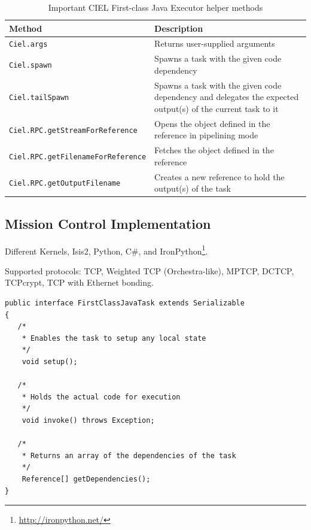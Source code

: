 \documentclass[a4paper,12pt,twoside,openright]{report}
\begin{document}
\begin{table}
  \centering
  \begin{tabularx}{6in}{|X|X|} 
    \hline
	\textbf{Method} & \textbf{Description} \\ \hline \hline
    \texttt{Ciel.args} & Returns user-supplied arguments \\ \hline
    \texttt{Ciel.spawn} & Spawns a task with the given code dependency \\ \hline
    \texttt{Ciel.tailSpawn} & Spawns a task with the given code dependency and
    delegates the expected output(s) of the current task to it
    \\ \hline
    \texttt{Ciel.RPC.getStreamForReference} & Opens the object defined
    in the reference in pipelining mode \\ \hline
    \texttt{Ciel.RPC.getFilenameForReference} & Fetches the object defined in
    the reference \\ \hline
     \texttt{Ciel.RPC.getOutputFilename} & Creates a new reference to hold the
     output(s) of the task \\ \hline
 \end{tabularx} 
  \caption{Important CIEL First-class Java Executor helper methods}
  \label{chap:implem:sec:ciel:tab:task}
\end{table}

\subsection{Mission Control Implementation}

Different Kernels, Isis2, Python, C\#, and
IronPython\footnote{\url{http://ironpython.net/}}.

Supported protocols: TCP, Weighted TCP (Orchestra-like), MPTCP, DCTCP, TCPcrypt,
TCP with Ethernet bonding.

\begin{lstlisting}[caption={\texttt{FirstClassJavaTask}
Interface},label={lst:firstclassjavatask}] 
public interface FirstClassJavaTask extends Serializable 
{   
   /* 
    * Enables the task to setup any local state
    */
	void setup();
	
   /*
    * Holds the actual code for execution
    */	
	void invoke() throws Exception;	
	
   /*
    * Returns an array of the dependencies of the task
    */
	Reference[] getDependencies();
}
\end{lstlisting}
\end{document}
